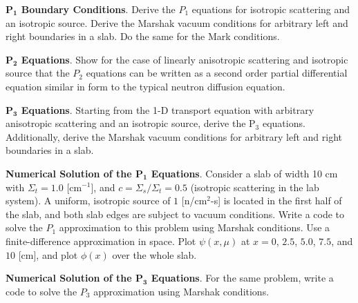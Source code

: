 \begin{exercises}

  \item  \textbf{P$_{\mathbf{1}}$ Boundary Conditions}. Derive the $P_1$ 
equations for isotropic scattering and an isotropic source.  Derive the Marshak 
vacuum conditions for arbitrary left and right boundaries in a slab.  Do the 
same for the Mark conditions. 

  \item \textbf{P$_{\mathbf{2}}$ Equations}. Show for the case of linearly 
anisotropic scattering and isotropic source that the $P_2$ equations can be 
written as a second order partial differential equation similar in form to the 
typical neutron diffusion equation.

  \item \textbf{P$_{\mathbf{3}}$ Equations}. Starting from the 1-D transport 
  equation with arbitrary anisotropic scattering
  and an isotropic source, derive the P$_3$ equations.  Additionally, 
  derive the Marshak vacuum conditions for arbitrary left and 
  right boundaries in a slab.  

  \item \textbf{Numerical Solution of the P$_{\mathbf{1}}$ Equations}. Consider 
a slab of width 10 cm with $\Sigma_t = 1.0$ [cm$^{-1}$], and $c = \Sigma_s / 
\Sigma_t = 0.5$ (isotropic scattering in the lab system).  A uniform, isotropic 
source of $1$ [n/cm$^2$-s] is located in the first half of the slab, and both 
slab edges are subject to vacuum conditions. Write a code to solve the $P_1$ 
approximation to this problem using Marshak conditions. Use a
finite-difference approximation in space. Plot $\psi(x,\mu)$ at 
$x = 0$, $2.5$, $5.0$, $7.5$, and $10$ [cm], and plot $\phi(x)$ over the whole 
slab.

  \item \textbf{Numerical Solution of the P$_{\mathbf{3}}$ Equations}. For the 
same problem, write a code to solve the $P_3$ approximation using Marshak 
conditions.


\end{exercises}
